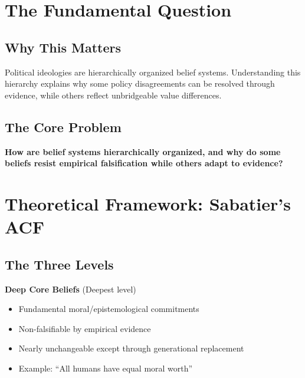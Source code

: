 \section{The Fundamental Question}
\label{sec:cj-fundamental}

\subsection{Why This Matters}

Political ideologies are hierarchically organized belief systems. Understanding this hierarchy explains why some policy disagreements can be resolved through evidence, while others reflect unbridgeable value differences.

\subsection{The Core Problem}

\begin{tcolorbox}[colback=red!5!white, colframe=red!75!black,
    title=The Fundamental Question]

\textbf{How are belief systems hierarchically organized, and why do some beliefs resist empirical falsification while others adapt to evidence?}

\end{tcolorbox}


\section{Theoretical Framework: Sabatier's ACF}
\label{sec:cj-theory}

\subsection{The Three Levels}

\textbf{Deep Core Beliefs} (Deepest level)
\begin{itemize}[nosep]
\item Fundamental moral/epistemological commitments
\item Non-falsifiable by empirical evidence
\item Nearly unchangeable except through generational replacement
\item Example: ``All humans have equal moral worth''
\end{itemize}

